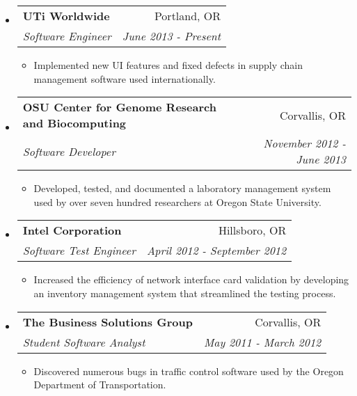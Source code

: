 \documentclass[letterpaper,11pt]{article}
\makeatletter
\newcommand{\resitem}[1]{\item #1 \vspace{-2pt}}
\newcommand{\ressubheading}[4]{

\begin{tabular*}{6.5in}{l@{\cftdotfill{\cftsecdotsep}\extracolsep{\fill}}r}

\textbf{#1} & #2 \\

\textit{#3} & \textit{#4} \\

\end{tabular*}\vspace{-6pt}}
\makeatother
\begin{document}
\begin{itemize}

	\item
	
	\ressubheading{UTi Worldwide}{Portland, OR}{Software Engineer}{June 2013 - Present}

	\begin{itemize}

	\resitem{Implemented new UI features and fixed defects in supply chain management software used internationally.}

	\end{itemize}

	\item
        
	\ressubheading{OSU Center for Genome Research and Biocomputing}{Corvallis, OR}{Software Developer}{November 2012 - June 2013}

        \begin{itemize}

    	\resitem{Developed, tested, and documented a laboratory management system used by over seven hundred researchers at Oregon State University.}

	\end{itemize}

	\item
        
	\ressubheading{Intel Corporation}{Hillsboro, OR}{Software Test Engineer}{April 2012 - September 2012}

        \begin{itemize}

    	\resitem{Increased the efficiency of network interface card validation by developing an inventory management system that streamlined the testing process.}

	\end{itemize}

	\item
	
	\ressubheading{The Business Solutions Group}{Corvallis, OR}{Student Software Analyst}{May 2011 -  March 2012}

       	\begin{itemize}

	\resitem{Discovered numerous bugs in traffic control software used by the Oregon Department of Transportation.}

	\end{itemize}
	
\end{itemize}
\end{document}
